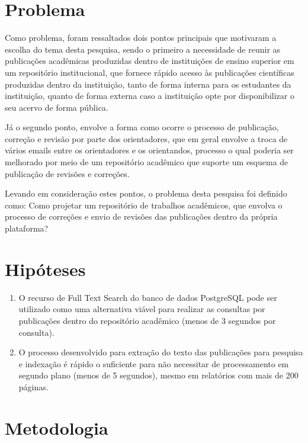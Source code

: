 \section{Problema} \label{sec::Problem}

Como problema, foram ressaltados dois pontos principais que motivaram a escolha do tema desta pesquisa, sendo o primeiro a necessidade de reunir as publicações acadêmicas produzidas dentro de instituições de ensino superior em um repositório institucional, que fornece rápido acesso às publicações científicas produzidas dentro da instituição, tanto de forma interna para os estudantes da instituição, quanto de forma externa caso a instituição opte por disponibilizar o seu acervo de forma pública.

Já o segundo ponto, envolve a forma como ocorre o processo de publicação, correção e revisão por parte dos orientadores, que em geral envolve a troca de vários emails entre os orientadores e os orientandos, processo o qual poderia ser melhorado por meio de um repositório acadêmico que suporte um esquema de publicação de revisões e correções.

Levando em consideração estes pontos, o problema desta pesquisa foi definido como: Como projetar um repositório de trabalhos acadêmicos, que envolva o processo de correções e envio de revisões das publicações dentro da própria plataforma?


\section{Hipóteses} \label{sec::Hypothesis}
\begin{enumerate}
    \item O recurso de Full Text Search do banco de dados PostgreSQL pode ser utilizado como uma alternativa viável para realizar as consultas por publicações dentro do repositório acadêmico (menos de 3 segundos por consulta).
    \item O processo desenvolvido para extração do texto das publicações para pesquisa e indexação é rápido o suficiente para não necessitar de processamento em segundo plano (menos de 5 segundos), mesmo em relatórios com mais de 200 páginas.
\end{enumerate}


\section{Metodologia} \label{sec:Methodology}

